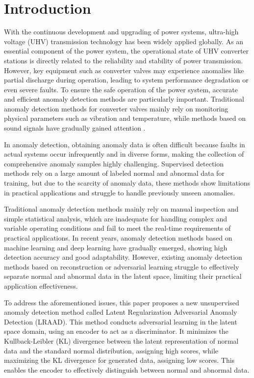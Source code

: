 \documentclass{article}
\begin{document}
\section{Introduction}
With the continuous development and upgrading of power systems, ultra-high voltage (UHV) transmission technology has been widely applied globally. As an essential component of the power system, the operational state of UHV converter stations is directly related to the reliability and stability of power transmission. However, key equipment such as converter valves may experience anomalies like partial discharge during operation, leading to system performance degradation or even severe faults. To ensure the safe operation of the power system, accurate and efficient anomaly detection methods are particularly important. Traditional anomaly detection methods for converter valves mainly rely on monitoring physical parameters such as vibration and temperature, while methods based on sound signals have gradually gained attention \cite{AR-AD}.

In anomaly detection, obtaining anomaly data is often difficult because faults in actual systems occur infrequently and in diverse forms, making the collection of comprehensive anomaly samples highly challenging. Supervised detection methods rely on a large amount of labeled normal and abnormal data for training, but due to the scarcity of anomaly data, these methods show limitations in practical applications and struggle to handle previously unseen anomalies.

Traditional anomaly detection methods mainly rely on manual inspection and simple statistical analysis, which are inadequate for handling complex and variable operating conditions and fail to meet the real-time requirements of practical applications. In recent years, anomaly detection methods based on machine learning and deep learning have gradually emerged, showing high detection accuracy and good adaptability. However, existing anomaly detection methods based on reconstruction or adversarial learning struggle to effectively separate normal and abnormal data in the latent space, limiting their practical application effectiveness.

To address the aforementioned issues, this paper proposes a new unsupervised anomaly detection method called Latent Regularization Adversarial Anomaly Detection (LRAAD). This method conducts adversarial learning in the latent space domain, using an encoder to act as a discriminator. It minimizes the Kullback-Leibler (KL) divergence between the latent representation of normal data and the standard normal distribution, assigning high scores, while maximizing the KL divergence for generated data, assigning low scores. This enables the encoder to effectively distinguish between normal and abnormal data.
\end{document}
